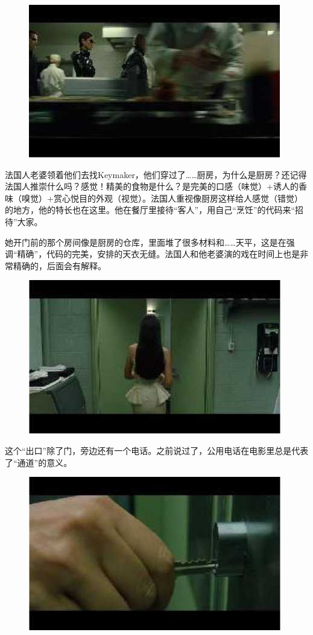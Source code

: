 \documentclass{ctexart}
\begin{document}
\begin{figure}[htb]
\centering
\includegraphics[width=0.5\linewidth]{fig/read_reloaded-108-1}
\end{figure}

法国人老婆领着他们去找Keymaker，他们穿过了……厨房，为什么是厨房？还记得法国人推崇什么吗？感觉！精美的食物是什么？是完美的口感（味觉）+诱人的香味（嗅觉）+赏心悦目的外观（视觉）。法国人重视像厨房这样给人感觉（错觉）的地方，他的特长也在这里。他在餐厅里接待“客人”，用自己“烹饪”的代码来“招待”大家。

她开门前的那个房间像是厨房的仓库，里面堆了很多材料和……天平，这是在强调“精确”，代码的完美，安排的天衣无缝。法国人和他老婆演的戏在时间上也是非常精确的，后面会有解释。

\begin{figure}[htb]
\centering
\includegraphics[width=0.5\linewidth]{fig/read_reloaded-109}
\end{figure}

这个“出口”除了门，旁边还有一个电话。之前说过了，公用电话在电影里总是代表了“通道”的意义。

\begin{figure}[htb]
\centering
\includegraphics[width=0.5\linewidth]{fig/read_reloaded-110}
\end{figure}
\end{document}
